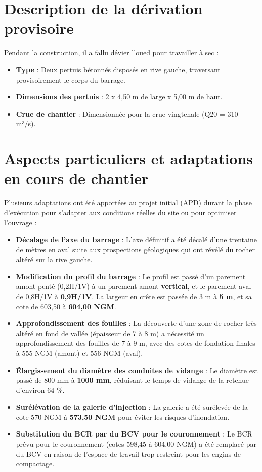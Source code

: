\section{Description de la dérivation provisoire}
\label{sec:derivation_provisoire}

Pendant la construction, il a fallu dévier l'oued pour travailler à sec \cite{fiche_historique, fiche_synoptique} :
\begin{itemize}
    \item \textbf{Type} : Deux pertuis bétonnés disposés en rive gauche, traversant provisoirement le corps du barrage.
    \item \textbf{Dimensions des pertuis} : 2 x 4,50 m de large x 5,00 m de haut.
    \item \textbf{Crue de chantier} : Dimensionnée pour la crue vingtenale (Q20 = 310 m³/s).
\end{itemize}

\section{Aspects particuliers et adaptations en cours de chantier}
\label{sec:adaptations_chantier}

Plusieurs adaptations ont été apportées au projet initial (APD) durant la phase d'exécution pour s'adapter aux conditions réelles du site ou pour optimiser l'ouvrage \cite{fiche_historique, note_geologique_2003} :

\begin{itemize}
    \item \textbf{Décalage de l'axe du barrage} : L'axe définitif a été décalé d'une trentaine de mètres en aval suite aux prospections géologiques qui ont révélé du rocher altéré sur la rive gauche.
    \item \textbf{Modification du profil du barrage} : Le profil est passé d'un parement amont penté (0,2H/1V) à un parement amont \textbf{vertical}, et le parement aval de 0,8H/1V à \textbf{0,9H/1V}. La largeur en crête est passée de 3 m à \textbf{5 m}, et sa cote de 603,50 à \textbf{604,00 NGM}.
    \item \textbf{Approfondissement des fouilles} : La découverte d'une zone de rocher très altéré en fond de vallée (épaisseur de 7 à 8 m) a nécessité un approfondissement des fouilles de 7 à 9 m, avec des cotes de fondation finales à 555 NGM (amont) et 556 NGM (aval).
    \item \textbf{Élargissement du diamètre des conduites de vidange} : Le diamètre est passé de 800 mm à \textbf{1000 mm}, réduisant le temps de vidange de la retenue d'environ 64 \%.
    \item \textbf{Surélévation de la galerie d'injection} : La galerie a été surélevée de la cote 570 NGM à \textbf{573,50 NGM} pour éviter les risques d'inondation.
    \item \textbf{Substitution du BCR par du BCV pour le couronnement} : Le BCR prévu pour le couronnement (cotes 598,45 à 604,00 NGM) a été remplacé par du BCV en raison de l'espace de travail trop restreint pour les engins de compactage.
\end{itemize}

